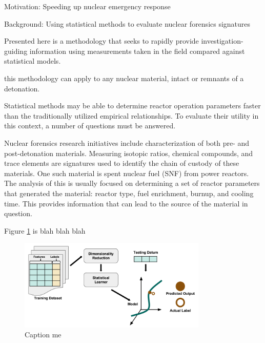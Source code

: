 \documentclass{beamer}
\begin{document}
\begin{frame}[t]{}
\begin{columns}
\begin{column}[T]{0.27\textwidth}
\begin{block}{Motivation: Speeding up nuclear emergency response}
\end{block}

\begin{block}{Background: Using statistical methods to evaluate nuclear forensics signatures}


Presented here is a methodology that seeks to rapidly provide
investigation-guiding information using measurements taken in the field
compared against statistical models. 

this methodology can apply to any nuclear material, intact
or remnants of a detonation. 


Statistical methods may be able to determine reactor operation parameters
faster than the traditionally utilized empirical relationships. To evaluate
their utility in this context, a number of questions must be answered.


Nuclear forensics research initiatives include characterization of both pre-
and post-detonation materials. Measuring isotopic ratios, chemical compounds,
and trace elements are signatures used to identify the chain of custody of
these materials. One such material is spent nuclear fuel (SNF) from power
reactors. The analysis of this is usually focused on determining a set of
reactor parameters that generated the material: reactor type, fuel enrichment,
burnup, and cooling time. This provides information that can lead to the source
of the material in question.

Figure \ref{fig:ml-intro} is blah blah blah

\begin{figure}
  \includegraphics[width=0.8\textwidth]{figures/SupervisedRegression.png}
  \caption{Caption me}
  \label{fig:ml-intro}
\end{figure}

\end{block}
\end{column}


\end{columns}
\end{frame}
\end{document}
